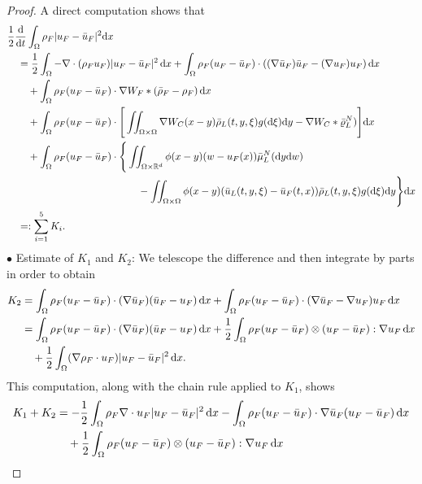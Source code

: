 \documentclass[10pt, reqno]{amsart}
\theoremstyle{definition}
\theoremstyle{remark}
\numberwithin{equation}{section}
\newcommand{\dx}{\textnormal{d}x}
\newcommand{\dy}{\textnormal{d}y}
\newcommand{\dw}{\textnormal{d}w}
\newcommand{\dxi}{\textnormal{d}\xi}
\newcommand{\ddt}{\frac{\textnormal{d}}{\textnormal{d}t}}
\newcommand{\R}{\mathbb{R}}
\begin{document}
\begin{proof}
    A direct computation shows that
    \begin{align*}
        &\frac{1}{2} \ddt\int_{\Omega} \rho_F |u_F - \bar u_F|^2\dx \\
        &\quad = \frac{1}{2}\int_{\Omega} -\nabla\cdot (\rho_F u_F) |u_F - \bar u_F|^2\,\dx + \int_{\Omega} \rho_F (u_F - \bar u_F)\cdot ((\nabla \bar u_F) \bar u_F - (\nabla u_F)u_F ) \,\dx \\
        &\qquad + \int_{\Omega} \rho_F (u_F - \bar u_F)\cdot \nabla W_F * (\bar \rho_F - \rho_F) \,\dx \\
        &\qquad +\int_{\Omega} \rho_F (u_F - \bar u_F)\cdot \Bigg[ \iint_{\Omega \times \Omega} \nabla W_C(x-y)\bar \rho_L(t,y,\xi)g(\textnormal{d}\xi)\dy - \nabla W_C * \bar\varrho_L^N) \Bigg] \dx \\
        &\qquad + \int_{\Omega} \rho_F (u_F - \bar u_F)\cdot \Bigg\{\iint_{\Omega\times \R^d}\phi(x-y)(w-u_F(x))\bar\mu_L^N(\dy\dw)  \\
        &\hspace{4.5cm} - \iint_{\Omega \times \Omega} \phi(x-y)(\bar u_L(t,y,\xi) - \bar u_F(t,x)) \bar \rho_L(t,y,\xi)g(\dxi)\dy  \Bigg\} \dx \\
        &\quad =: \sum_{i=1}^5 K_i.
    \end{align*}
    $\bullet$ Estimate of $K_1$ and $K_2$: We telescope the difference and then integrate by parts in order to obtain
    \begin{align*}
        K_2 &= \int_{\Omega} \rho_F (u_F - \bar u_F)\cdot (\nabla \bar u_F)(\bar u_F - u_F)\,\dx + \int_{\Omega} \rho_F (u_F - \bar u_F)\cdot (\nabla \bar u_F - \nabla u_F) u_F \,\dx \\
        &= \int_{\Omega} \rho_F (u_F - \bar u_F)\cdot (\nabla \bar u_F)(\bar u_F - u_F)\,\dx + \frac{1}{2}\int_{\Omega} \rho_F (u_F - \bar u_F)\otimes (u_F - \bar u_F): \nabla u_F \,\dx \\
        &\quad + \frac{1}{2}\int_{\Omega} (\nabla \rho_F \cdot u_F) |u_F - \bar u_F|^2\,\dx.
    \end{align*}
    This computation, along with the chain rule applied to $K_1$, shows
    \begin{align*}
        K_1 + K_2 &= -\frac{1}{2}\int_{\Omega} \rho_F \nabla\cdot u_F |u_F - \bar u_F|^2\,\dx - \int_{\Omega} \rho_F (u_F - \bar u_F)\cdot \nabla \bar u_F (u_F - \bar u_F) \,\dx \\
        &\quad + \frac{1}{2}\int_{\Omega} \rho_F(u_F-\bar u_F) \otimes (u_F - \bar u_F) :\nabla u_F\,\dx \\

\end{align*}
\end{proof}
\end{document}
